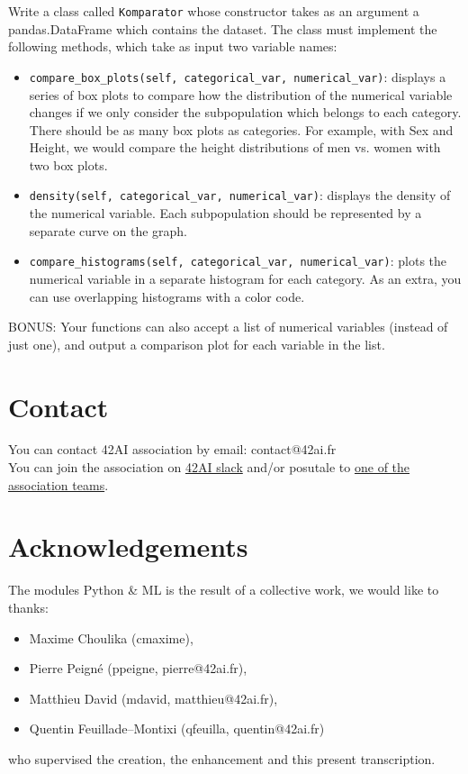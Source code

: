 \documentclass{42-en}
\begin{document}
Write a class called \texttt{Komparator} whose constructor takes as an argument a pandas.DataFrame which contains the dataset.
The class must implement the following methods, which take as input two variable names:
\begin{itemize}
  \item \texttt{compare\_box\_plots(self, categorical\_var, numerical\_var)}: displays a series of box plots 
  to compare how the distribution of the numerical variable changes if we only consider 
  the subpopulation which belongs to each category. 
  There should be as many box plots as categories. 
  For example, with Sex and Height, we would compare 
  the height distributions of men vs. women with two box plots.
  \item \texttt{density(self, categorical\_var, numerical\_var)}: displays the density of the numerical variable.
  Each subpopulation should be represented by a separate curve on the graph.
  \item \texttt{compare\_histograms(self, categorical\_var, numerical\_var)}: plots the numerical variable in a separate histogram for each category.
  As an extra, you can use overlapping histograms with a color code.
\end{itemize}

BONUS: Your functions can also accept a list of numerical variables (instead of just one), and output a comparison plot for each variable in the list.


\newpage

\section*{Contact}
You can contact 42AI association by email: contact@42ai.fr\\
You can join the association on \href{https://join.slack.com/t/42-ai/shared_invite/zt-ebccw5r7-YPkDM6xOiYRPjqJXkrKgcA}{42AI slack}
and/or posutale to \href{https://forms.gle/VAFuREWaLmaqZw2D8}{one of the association teams}.

\section*{Acknowledgements}
The modules Python \& ML is the result of a collective work, we would like to thanks:
\begin{itemize}
  \item Maxime Choulika (cmaxime),
  \item Pierre Peigné (ppeigne, pierre@42ai.fr),
  \item Matthieu David (mdavid, matthieu@42ai.fr),
  \item Quentin Feuillade--Montixi (qfeuilla, quentin@42ai.fr)
\end{itemize}
who supervised the creation, the enhancement and this present transcription.
\end{document}
